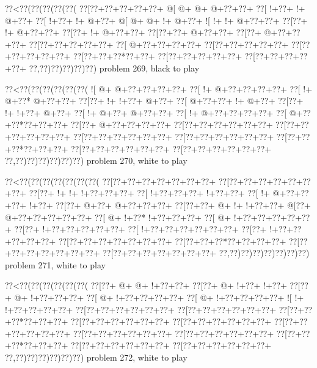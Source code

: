 \vbox{\vbox{\goo
\0??<\0??(\0??(\0??(\0??(\0??(
\0??[\0??+\0??+\0??+\0??+\0??+
\- @[\- @+\- @+\- @+\0??+\0??+
\0??[\- !+\0??+\- !+\- @+\0??+
\0??[\- !+\0??+\- !+\- @+\0??+
\- @[\- @+\- @+\- !+\- @+\0??+
\- ![\- !+\- !+\- @+\0??+\0??+
\0??[\0??+\- !+\- @+\0??+\0??+
\0??[\0??+\- !+\- @+\0??+\0??+
\0??[\0??+\0??+\- @+\0??+\0??+
\0??[\0??+\- @+\0??+\0??+\0??+
\0??[\0??+\0??+\0??+\0??+\0??+
\0??[\- @+\0??+\0??+\0??+\0??+
\0??[\0??+\0??+\0??+\0??+\0??+
\0??[\0??+\0??+\0??+\0??+\0??+
\0??[\0??+\0??+\0??*\0??+\0??+
\0??[\0??+\0??+\0??+\0??+\0??+
\0??[\0??+\0??+\0??+\0??+\0??+
\0??,\0??)\0??)\0??)\0??)\0??)
}
\hfil problem 269, black to play\hfil\break
}

\vbox{\vbox{\goo
\0??<\0??(\0??(\0??(\0??(\0??(\0??(
\- ![\- @+\- @+\0??+\0??+\0??+\0??+
\0??[\- !+\- @+\0??+\0??+\0??+\0??+
\0??[\- !+\- @+\0??*\- @+\0??+\0??+
\0??[\0??+\- !+\- !+\0??+\- @+\0??+
\0??[\- @+\0??+\0??+\- !+\- @+\0??+
\0??[\0??+\- !+\- !+\0??+\- @+\0??+
\0??[\- !+\- @+\0??+\- @+\0??+\0??+
\0??[\- !+\- @+\0??+\0??+\0??+\0??+
\0??[\- @+\0??+\0??*\0??+\0??+\0??+
\0??[\0??+\- @+\0??+\0??+\0??+\0??+
\0??[\0??+\0??+\0??+\0??+\0??+\0??+
\0??[\0??+\0??+\0??+\0??+\0??+\0??+
\0??[\0??+\0??+\0??+\0??+\0??+\0??+
\0??[\0??+\0??+\0??+\0??+\0??+\0??+
\0??[\0??+\0??+\0??*\0??+\0??+\0??+
\0??[\0??+\0??+\0??+\0??+\0??+\0??+
\0??[\0??+\0??+\0??+\0??+\0??+\0??+
\0??,\0??)\0??)\0??)\0??)\0??)\0??)
}
\hfil problem 270, white to play\hfil\break
}

\vbox{\vbox{\goo
\0??<\0??(\0??(\0??(\0??(\0??(\0??(\0??(
\0??[\0??+\0??+\0??+\0??+\0??+\0??+\0??+
\0??[\0??+\0??+\0??+\0??+\0??+\0??+\0??+
\0??[\0??+\- !+\- !+\- !+\0??+\0??+\0??+
\0??[\- !+\0??+\0??+\0??+\- !+\0??+\0??+
\0??[\- !+\- @+\0??+\0??+\0??+\- !+\0??+
\0??[\0??+\- @+\0??+\- @+\0??+\0??+\0??+
\0??[\0??+\0??+\- @+\- !+\- !+\0??+\0??+
\- @[\0??+\- @+\0??+\0??+\0??+\0??+\0??+
\0??[\- @+\- !+\0??*\- !+\0??+\0??+\0??+
\0??[\- @+\- !+\0??+\0??+\0??+\0??+\0??+
\0??[\0??+\- !+\0??+\0??+\0??+\0??+\0??+
\0??[\- !+\0??+\0??+\0??+\0??+\0??+\0??+
\0??[\0??+\- !+\0??+\0??+\0??+\0??+\0??+
\0??[\0??+\0??+\0??+\0??+\0??+\0??+\0??+
\0??[\0??+\0??+\0??*\0??+\0??+\0??+\0??+
\0??[\0??+\0??+\0??+\0??+\0??+\0??+\0??+
\0??[\0??+\0??+\0??+\0??+\0??+\0??+\0??+
\0??,\0??)\0??)\0??)\0??)\0??)\0??)\0??)
}
\hfil problem 271, white to play\hfil\break
}

\vbox{\vbox{\goo
\0??<\0??(\0??(\0??(\0??(\0??(\0??(
\0??[\0??+\- @+\- @+\- !+\0??+\0??+
\0??[\0??+\- @+\- !+\0??+\- !+\0??+
\0??[\0??+\- @+\- !+\0??+\0??+\0??+
\0??[\- @+\- !+\0??+\0??+\0??+\0??+
\0??[\- @+\- !+\0??+\0??+\0??+\0??+
\- ![\- !+\- !+\0??+\0??+\0??+\0??+
\0??[\0??+\0??+\0??+\0??+\0??+\0??+
\0??[\0??+\0??+\0??+\0??+\0??+\0??+
\0??[\0??+\0??+\0??*\0??+\0??+\0??+
\0??[\0??+\0??+\0??+\0??+\0??+\0??+
\0??[\0??+\0??+\0??+\0??+\0??+\0??+
\0??[\0??+\0??+\0??+\0??+\0??+\0??+
\0??[\0??+\0??+\0??+\0??+\0??+\0??+
\0??[\0??+\0??+\0??+\0??+\0??+\0??+
\0??[\0??+\0??+\0??*\0??+\0??+\0??+
\0??[\0??+\0??+\0??+\0??+\0??+\0??+
\0??[\0??+\0??+\0??+\0??+\0??+\0??+
\0??,\0??)\0??)\0??)\0??)\0??)\0??)
}
\hfil problem 272, white to play\hfil\break
}

